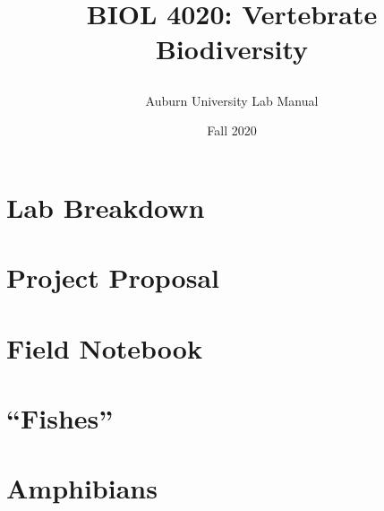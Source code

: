 \documentclass[oneside]{book}
\title{\LARGE{BIOL 4020: Vertebrate Biodiversity}
\author{\Large{Auburn University Lab Manual}
\date{\Large{Fall 2020}}
}}
\begin{document}
\maketitle
\tableofcontents
\chapter{\Huge{Lab Breakdown}} \label{SecLabBreak}
\chapter{\Huge{Project Proposal}} \label{SecProjProp}
\chapter{\Huge{Field Notebook}} \label{SecFieldNote}
\chapter{\Huge{``Fishes''}}  \label{SecFish}
\chapter{\Huge{Amphibians}} \label{SecAmphib}
\end{document}
